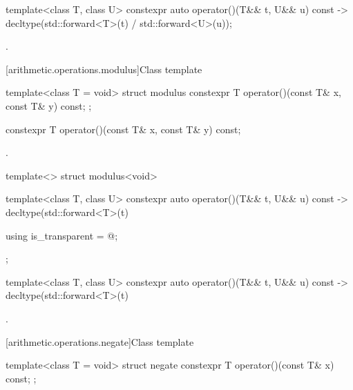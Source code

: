 %
\begin{itemdecl}
template<class T, class U> constexpr auto operator()(T&& t, U&& u) const
    -> decltype(std::forward<T>(t) / std::forward<U>(u));
\end{itemdecl}

\begin{itemdescr}
\pnum\returns {}.
\end{itemdescr}

[arithmetic.operations.modulus]{Class template }

%
\begin{itemdecl}
template<class T = void> struct modulus {
  constexpr T operator()(const T& x, const T& y) const;
};
\end{itemdecl}

%
\begin{itemdecl}
constexpr T operator()(const T& x, const T& y) const;
\end{itemdecl}

\begin{itemdescr}
\pnum\returns {}.
\end{itemdescr}

%
\begin{itemdecl}
template<> struct modulus<void> {
  template<class T, class U> constexpr auto operator()(T&& t, U&& u) const
    -> decltype(std::forward<T>(t) %

  using is_transparent = @\unspec@;
};
\end{itemdecl}

%
\begin{itemdecl}
template<class T, class U> constexpr auto operator()(T&& t, U&& u) const
    -> decltype(std::forward<T>(t) %
\end{itemdecl}

\begin{itemdescr}
\pnum\returns {}.
\end{itemdescr}

[arithmetic.operations.negate]{Class template }

%
\begin{itemdecl}
template<class T = void> struct negate {
  constexpr T operator()(const T& x) const;
};
\end{itemdecl}

